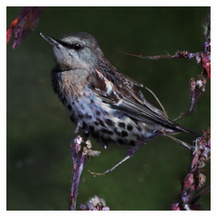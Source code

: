 \documentclass{article}
\begin{document}
\begin{figure}
\begin{subfigure}[b]{0.19\linewidth}
    \end{subfigure}
    \begin{subfigure}[b]{0.19\linewidth}
    \includegraphics[width=\linewidth]{figures/imagenet256/solver_samples/imagenet256_fm_ot_04_50.png}
    \end{subfigure}\\
    

\end{figure}
\end{document}
